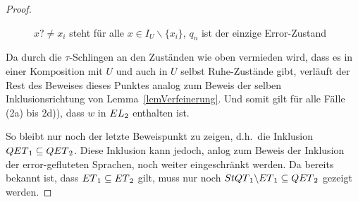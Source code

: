 \begin{proof}
\begin{itemize}
\begin{figure} [h!tbp]
\begin{center}
        \caption{$x?\neq x_i$ steht für alle $x\in I_U\backslash\{x_i\}$, $q_n$
          ist der einzige Error-Zustand}
\label{UmitEundTau}
      \end{center}
      \end{figure}
      Da durch die $\tau$-Schlingen an den Zuständen wie oben vermieden wird,
      dass es in einer Komposition mit $U$ und auch in $U$ selbst Ruhe-Zustände
      gibt, verläuft der Rest des Beweises dieses Punktes analog zum Beweis der
      selben Inklusionsrichtung von
      Lemma~\ref{lemVerfeinerung}. Und somit gilt für alle Fälle (2a) bis 2d)),
      dass $w$ in $EL{}_2$ enthalten ist.
  \end{itemize}

  So bleibt nur noch der letzte Beweispunkt zu zeigen, d.h.\ die Inklusion
  $QET{}_1\subseteq QET{}_2$. Diese Inklusion kann jedoch, anlog zum Beweis
  der Inklusion der error-gefluteten Sprachen, noch weiter eingeschränkt werden.
  Da bereits bekannt ist, dass $ET{}_1\subseteq ET{}_2$ gilt, muss nur
  noch $StQT{}_1\backslash ET{}_1\subseteq QET{}_2$ gezeigt werden.


\end{proof}
